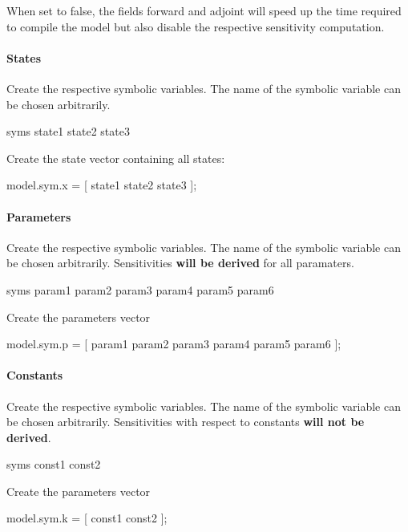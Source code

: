 When set to false, the fields \textquotesingle{}forward\textquotesingle{} and \textquotesingle{}adjoint\textquotesingle{} will speed up the time required to compile the model but also disable the respective sensitivity computation.

\paragraph*{States}

Create the respective symbolic variables. The name of the symbolic variable can be chosen arbitrarily. \begin{DoxyVerb}syms state1 state2 state3
\end{DoxyVerb}


Create the state vector containing all states\+: \begin{DoxyVerb}model.sym.x = [ state1 state2 state3 ];
\end{DoxyVerb}


\paragraph*{Parameters}

Create the respective symbolic variables. The name of the symbolic variable can be chosen arbitrarily. Sensitivities {\bfseries will be derived} for all paramaters. \begin{DoxyVerb}syms param1 param2 param3 param4 param5 param6
\end{DoxyVerb}


Create the parameters vector \begin{DoxyVerb}model.sym.p = [ param1 param2 param3 param4 param5 param6 ];
\end{DoxyVerb}


\paragraph*{Constants}

Create the respective symbolic variables. The name of the symbolic variable can be chosen arbitrarily. Sensitivities with respect to constants {\bfseries will not be derived}. \begin{DoxyVerb}syms const1 const2
\end{DoxyVerb}


Create the parameters vector \begin{DoxyVerb}model.sym.k = [ const1 const2 ];
\end{DoxyVerb}


